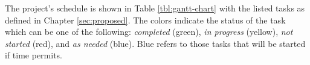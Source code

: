 The project's schedule is shown in Table \ref{tbl:gantt-chart} with the listed tasks as defined in Chapter \ref{sec:proposed}. The colors indicate the status of the task which can be one of the following: \emph{completed} (green), \emph{in progress} (yellow), \emph{not started} (red), and \emph{as needed} (blue). Blue refers to those tasks that will be started if time permits.

